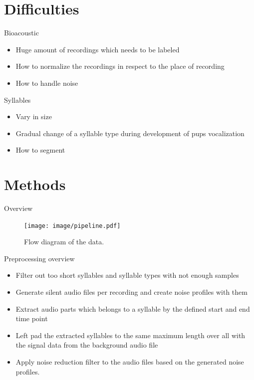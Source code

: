 \documentclass[10pt]{beamer}
\begin{document}
\section{Difficulties}
\begin{frame}{Bioacoustic}
\begin{itemize}
\item Huge amount of recordings which needs to be labeled
\item How to normalize the recordings in respect to the place of recording
\item How to handle noise
\end{itemize}
\end{frame}

\begin{frame}{Syllables}
\begin{itemize}
\item Vary in size
\item Gradual change of a syllable type during development of pups vocalization
\item How to segment
\end{itemize}
\end{frame}

\section{Methods}
\begin{frame}{Overview}
\begin{figure}
\centering
    \texttt{[image: image/pipeline.pdf]}
    \caption{Flow diagram of the data.}
    \label{fig:pipeline}
\end{figure}
\end{frame}

\begin{frame}{Preprocessing overview}
\begin{itemize}
\item Filter out too short syllables and syllable types with not enough samples
\item Generate silent audio files per recording and create noise profiles with them
\item Extract audio parts which belongs to a syllable by the defined start and end time point
\item Left pad the extracted syllables to the same maximum length over all with the signal data from the background audio file
\item Apply noise reduction filter to the audio files based on the generated noise profiles.
\end{itemize}
\end{frame}
\end{document}
